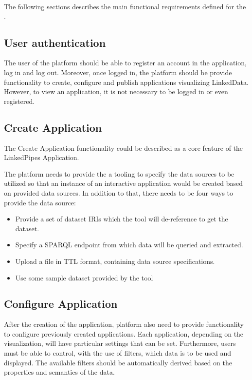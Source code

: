 The following sections describes the main functional requirements defined for the \lpa{}. 

\subsection{User authentication}

The user of the platform should be able to register an account in the application, log in and log out. Moreover, once logged in, the platform should be provide functionality to create, configure and publish applications visualizing LinkedData. However, to view an application, it is not necessary to be logged in or even registered.

\subsection{Create Application}

The Create Application functionality could be described as a core feature of the LinkedPipes Application.

The platform needs to provide the a tooling to specify the data sources to be utilized so that an instance of an interactive application would be created based on provided data sources. In addition to that, there needs to be four ways to provide the data source:

\begin{itemize}
\item Provide a set of dataset \acrshort{IRI}s which the tool will de-reference to get the dataset.
\item Specify a \acrshort{SPARQL} endpoint from which data will be queried and extracted.
\item Upload a file in \acrshort{TTL} format, containing data source specifications.
\item Use some sample dataset provided by the tool
\end{itemize}

\subsection{Configure Application}

After the creation of the application, platform also need to provide functionality to configure previously created applications. Each application, depending on the visualization, will have particular settings that can be set. Furthermore, users must be able to control, with the use of filters, which data is to be used and displayed. The available filters should be automatically derived based on the properties and semantics of the data. 

